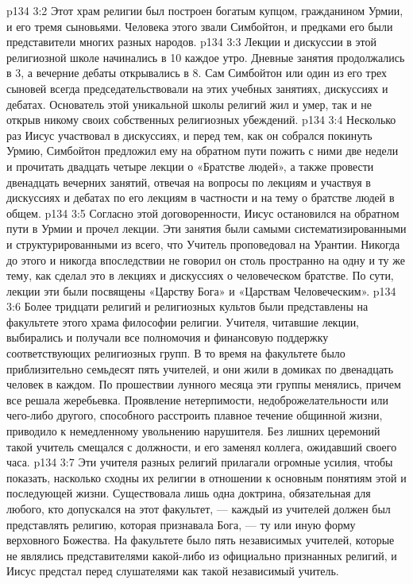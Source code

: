 \vs p134 3:2 Этот храм религии был построен богатым купцом, гражданином Урмии, и его тремя сыновьями. Человека этого звали Симбойтон, и предками его были представители многих разных народов.
\vs p134 3:3 Лекции и дискуссии в этой религиозной школе начинались в 10 каждое утро. Дневные занятия продолжались в 3, а вечерние дебаты открывались в 8. Сам Симбойтон или один из его трех сыновей всегда председательствовали на этих учебных занятиях, дискуссиях и дебатах. Основатель этой уникальной школы религий жил и умер, так и не открыв никому своих собственных религиозных убеждений.
\vs p134 3:4 Несколько раз Иисус участвовал в дискуссиях, и перед тем, как он собрался покинуть Урмию, Симбойтон предложил ему на обратном пути пожить с ними две недели и прочитать двадцать четыре лекции о «Братстве людей», а также провести двенадцать вечерних занятий, отвечая на вопросы по лекциям и участвуя в дискуссиях и дебатах по его лекциям в частности и на тему о братстве людей в общем.
\vs p134 3:5 Согласно этой договоренности, Иисус остановился на обратном пути в Урмии и прочел лекции. Эти занятия были самыми систематизированными и структурированными из всего, что Учитель проповедовал на Урантии. Никогда до этого и никогда впоследствии не говорил он столь пространно на одну и ту же тему, как сделал это в лекциях и дискуссиях о человеческом братстве. По сути, лекции эти были посвящены «Царству Бога» и «Царствам Человеческим».
\vs p134 3:6 Более тридцати религий и религиозных культов были представлены на факультете этого храма философии религии. Учителя, читавшие лекции, выбирались и получали все полномочия и финансовую поддержку соответствующих религиозных групп. В то время на факультете было приблизительно семьдесят пять учителей, и они жили в домиках по двенадцать человек в каждом. По прошествии лунного месяца эти группы менялись, причем все решала жеребьевка. Проявление нетерпимости, недоброжелательности или чего\hyp{}либо другого, способного расстроить плавное течение общинной жизни, приводило к немедленному увольнению нарушителя. Без лишних церемоний такой учитель смещался с должности, и его заменял коллега, ожидавший своего часа.
\vs p134 3:7 Эти учителя разных религий прилагали огромные усилия, чтобы показать, насколько сходны их религии в отношении к основным понятиям этой и последующей жизни. Существовала лишь одна доктрина, обязательная для любого, кто допускался на этот факультет, --- каждый из учителей должен был представлять религию, которая признавала Бога, --- ту или иную форму верховного Божества. На факультете было пять независимых учителей, которые не являлись представителями какой\hyp{}либо из официально признанных религий, и Иисус предстал перед слушателями как такой независимый учитель.
